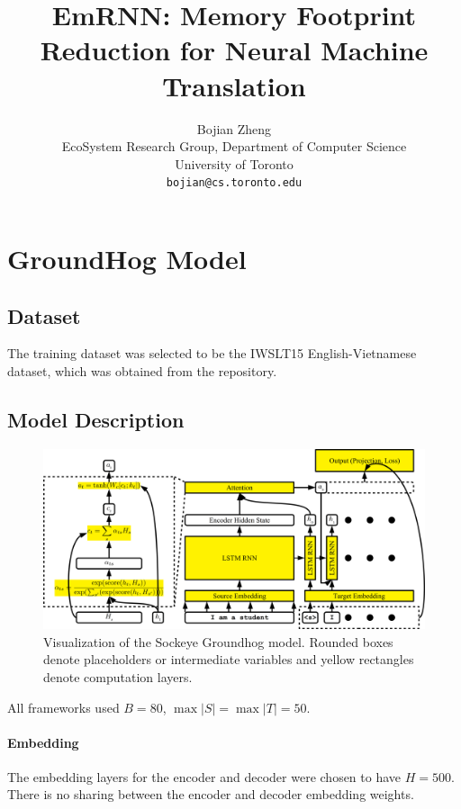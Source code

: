 \documentclass{article}
\title{EmRNN: Memory Footprint Reduction for Neural Machine Translation}
\author{
  Bojian Zheng \\
  EcoSystem Research Group, Department of Computer Science \\
  University of Toronto \\
  \texttt{bojian@cs.toronto.edu} \\
}
\begin{document}
\maketitle

\section{GroundHog Model}

\subsection{Dataset}

The training dataset was selected to be the IWSLT15 English-Vietnamese dataset, 
which was obtained from the  \cite{tf-nmt} repository.

\subsection{Model Description}

\begin{figure}[ht]
  \begin{center}
    \includegraphics[width=0.99\linewidth]{./graphs/groundhog.png}
    \caption{Visualization of the Sockeye Groundhog model. 
    Rounded boxes denote placeholders or intermediate variables and yellow rectangles denote computation layers.}
  \end{center}
\end{figure}

All frameworks used \(B=80\), \(\max{|S|}=\max{|T|}=50\).

\paragraph{Embedding}
The embedding layers for the encoder and decoder were chosen to have \(H=500\).
There is no sharing between the encoder and decoder embedding weights.
\end{document}
